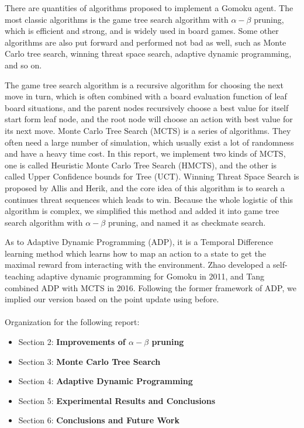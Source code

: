 \documentclass[sigconf, nonacm]{acmart}
\begin{document}
There are quantities of algorithms proposed to implement a Gomoku agent.
%
The most classic algorithms is the game tree search algorithm with $\alpha-\beta$ pruning, which is efficient and strong, and is widely used in board games.
%
Some other algorithms are also put forward and performed not bad as well, such as Monte Carlo tree search, winning threat space search, adaptive dynamic programming, and so on.

The game tree search algorithm is a recursive algorithm 
for choosing the next move in turn, which is often combined with a board evaluation function of leaf board situations, and the parent nodes recursively choose a best value for itself start form leaf node, and the root node will choose an action with best value for its next move.
%
Monte Carlo Tree Search (MCTS) is a series of algorithms. They often need a large number of simulation, which usually exist a lot of randomness and have a heavy time cost. In this report, we implement two kinds of MCTS, one is called Heuristic Monte Carlo Tree Search (HMCTS), and the other is called Upper Confidence bounds for Tree (UCT).
%
Winning Threat Space Search is proposed
by Allis and Herik, and the core idea of this algorithm is to search a continues threat sequences which leads to win. Because the whole logistic of this algorithm is complex, we simplified this method and added it into game tree search algorithm with $\alpha-\beta$ pruning, and named it as checkmate search.
%

%
As to Adaptive Dynamic Programming (ADP), it is a Temporal Difference learning method which learns how to map an action to a
state to get the maximal reward from interacting with the environment. Zhao\cite{Zhao/ztt} developed a self-teaching adaptive dynamic programming for Gomoku in 2011, and Tang\cite{Tang/ztt} combined ADP with MCTS in 2016. Following the former framework of ADP, we implied our version based on the point update using before.
%
\\
\\
\noindent Organization for the following report:
\begin{itemize}
\item Section 2: \textbf{Improvements of $\alpha-\beta$ pruning}
\item Section 3: \textbf{Monte Carlo Tree Search}
\item Section 4: \textbf{Adaptive Dynamic Programming}
\item Section 5: \textbf{Experimental Results and Conclusions}
\item Section 6: \textbf{Conclusions and Future Work}
\end{itemize}
\end{document}
